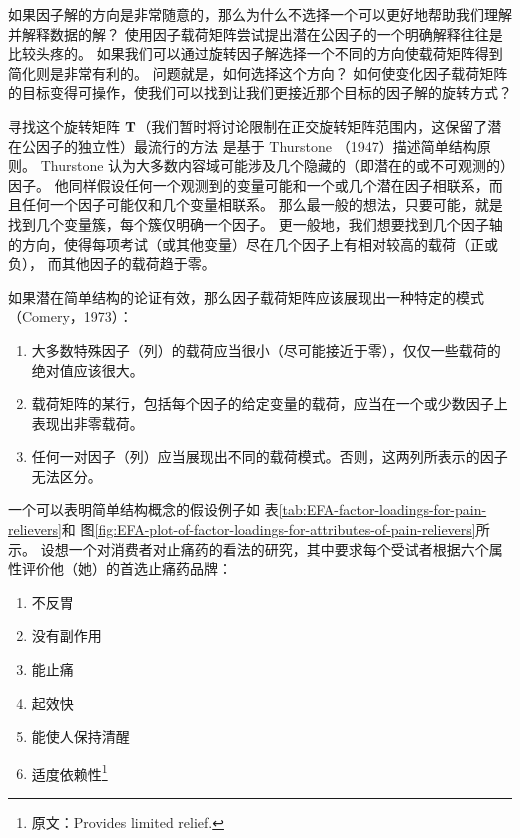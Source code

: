 如果因子解的方向是非常随意的，那么为什么不选择一个可以更好地帮助我们理解并解释数据的解？
使用因子载荷矩阵尝试提出潜在公因子的一个明确解释往往是比较头疼的。
如果我们可以通过旋转因子解选择一个不同的方向使载荷矩阵得到简化则是非常有利的。
问题就是，如何选择这个方向？
如何使变化因子载荷矩阵的目标变得可操作，使我们可以找到让我们更接近那个目标的因子解的旋转方式？

寻找这个旋转矩阵 $ \mathbf{T} $（我们暂时将讨论限制在正交旋转矩阵范围内，这保留了潜在公因子的独立性）最流行的方法
是基于 Thurstone （1947）描述简单结构原则。
Thurstone 认为大多数内容域可能涉及几个隐藏的（即潜在的或不可观测的）因子。
他同样假设任何一个观测到的变量可能和一个或几个潜在因子相联系，而且任何一个因子可能仅和几个变量相联系。
那么最一般的想法，只要可能，就是找到几个变量簇，每个簇仅明确一个因子。
更一般地，我们想要找到几个因子轴的方向，使得每项考试（或其他变量）尽在几个因子上有相对较高的载荷（正或负），
而其他因子的载荷趋于零。

如果潜在简单结构的论证有效，那么因子载荷矩阵应该展现出一种特定的模式（Comery，1973）：
\begin{enumerate}
    \item 大多数特殊因子（列）的载荷应当很小（尽可能接近于零），仅仅一些载荷的绝对值应该很大。
    \item 载荷矩阵的某行，包括每个因子的给定变量的载荷，应当在一个或少数因子上表现出非零载荷。
    \item 任何一对因子（列）应当展现出不同的载荷模式。否则，这两列所表示的因子无法区分。
\end{enumerate}

一个可以表明简单结构概念的假设例子如
表\ref{tab:EFA-factor-loadings-for-pain-relievers}和
图\ref{fig:EFA-plot-of-factor-loadings-for-attributes-of-pain-relievers}所示。
设想一个对消费者对止痛药的看法的研究，其中要求每个受试者根据六个属性评价他（她）的首选止痛药品牌：
\begin{enumerate}
    \item 不反胃
    \item 没有副作用
    \item 能止痛
    \item 起效快
    \item 能使人保持清醒
    \item 适度依赖性\footnote{原文：Provides limited relief.}
\end{enumerate}

